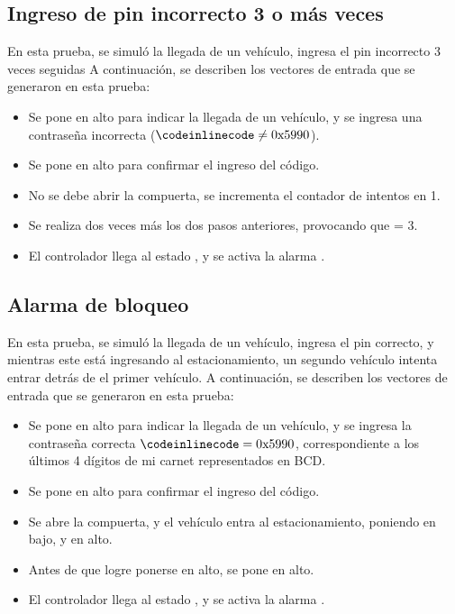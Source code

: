 \subsection{Ingreso de pin incorrecto 3 o más veces \cmark}
En esta prueba, se simuló la llegada de un vehículo, ingresa el pin incorrecto 3 veces seguidas
A continuación, se describen los vectores de entrada que se generaron en esta prueba:
\begin{itemize}
    \item Se pone  en alto para indicar la llegada de un vehículo, y se ingresa una contraseña incorrecta ($\code{code} \neq \text{0x5990}$).
    \item Se pone en alto  para confirmar el ingreso del código.
    \item No se debe abrir la compuerta, se incrementa el contador de intentos en 1.
    \item Se realiza dos veces más los dos pasos anteriores, provocando que  = 3. 
    \item El controlador llega al estado , y se activa la alarma . 
\end{itemize}
\subsection{Alarma de bloqueo \cmark}
En esta prueba, se simuló la llegada de un vehículo, ingresa el pin correcto, y mientras este está ingresando al estacionamiento, un segundo vehículo intenta entrar detrás de el primer vehículo. 
A continuación, se describen los vectores de entrada que se generaron en esta prueba:
\begin{itemize}
    \item Se pone en alto  para indicar la llegada de un vehículo, y se ingresa la contraseña correcta $\code{code} = \text{0x5990}$, correspondiente a los últimos 4 dígitos de mi carnet representados en BCD. 
    \item Se pone en alto  para confirmar el ingreso del código.
    \item Se abre la compuerta, y el vehículo entra al estacionamiento, poniendo  en bajo, y  en alto. 
    \item Antes de que  logre ponerse en alto,  se pone en alto.
    \item El controlador llega al estado , y se activa la alarma . 
\end{itemize}
